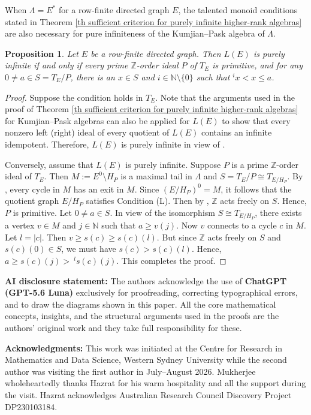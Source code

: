 \documentclass[a4paper,reqno,12pt]{amsart}
\numberwithin{equation}{section}
\newtheorem{prop}[thm]{Proposition}
\theoremstyle{definition}
\theoremstyle{remark}
\begin{document}
When $\Lambda=E^*$ for a row-finite directed graph $E$, the talented monoid conditions stated in Theorem \ref{th sufficient criterion for purely infinite higher-rank algebras} are also necessary for pure infiniteness of the Kumjian--Pask algebra of $\Lambda$.

\begin{prop}\label{prop Purely infinite LPA via TM}
Let $E$ be a row-finite directed graph. Then $L(E)$ is purely infinite if and only if every prime $\mathbb Z$-order ideal $P$ of $T_E$ is primitive, and for any $0\neq a\in S=T_E/{P}$, there is an $x\in S$ and $i\in \mathbb N\setminus \{0\}$ such that $^i x< x \leq a$.
\end{prop}
\begin{proof}
Suppose the condition holds in $T_E$. Note that the arguments used in the proof of Theorem \ref{th sufficient criterion for purely infinite higher-rank algebras} for Kumjian--Pask algebras can also be applied for $L(E)$ to show that every nonzero left (right) ideal of every quotient of $L(E)$ contains an infinite idempotent. Therefore, $L(E)$ is purely infinite in view of \cite[Theorem 7.4]{AGPM}. 

Conversely, assume that $L(E)$ is purely infinite. Suppose $P$ is a prime $\mathbb Z$-order ideal of $T_E$. Then $M:=E^0\setminus H_P$ is a maximal tail in $\Lambda$ and $S=T_E/P\cong T_{E/H_P}$. By \cite[Theorem 7.4]{AGPM}, every cycle in $M$ has an exit in $M$. Since $(E/H_P)^0=M$, it follows that the quotient graph $E/H_P$ satisfies Condition (L). Then by \cite[Corollary 4.3$(i)$]{hazli}, $\mathbb Z$ acts freely on $S$. Hence, $P$ is primitive. Let $0\neq a\in S$. In view of the isomorphism $S\cong T_{E/H_P}$, there exists a vertex $v\in M$ and $j\in \mathbb N$ such that $a\ge v(j)$. Now $v$ connects to a cycle $c$ in $M$. Let $l=|c|$. Then $v\ge s(c)\ge s(c)(l)$. But since $\mathbb Z$ acts freely on $S$ and $s(c)(0)\in S$, we must have $s(c)> s(c)(l)$. Hence, $a\ge s(c)(j)>~^ls(c)(j)$. This completes the proof.
\end{proof}

\textbf{AI disclosure statement:} The authors acknowledge the use of {\bf ChatGPT (GPT-5.6 Luna)} exclusively for proofreading, correcting typographical errors, and to draw the diagrams shown in this paper. All the core mathematical concepts, insights, and the structural arguments used in the proofs are the authors' original work and they take full responsibility for these.

\textbf{Acknowledgments:} This work was initiated at the Centre for Research in Mathematics and Data Science, Western Sydney University while the second author was visiting the first author in July--August 2026. Mukherjee wholeheartedly thanks Hazrat for his warm hospitality and all the support during the visit. Hazrat acknowledges Australian Research Council Discovery Project DP230103184.
\end{document}
